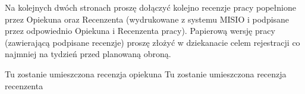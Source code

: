 \newpage

\noindent
Na kolejnych dwóch stronach proszę dołączyć 
kolejno recenzje pracy popełnione przez Opiekuna oraz Recenzenta 
(wydrukowane z systemu MISIO i podpisane 
przez odpowiednio Opiekuna i Recenzenta pracy). 
Papierową wersję pracy (zawierającą 
podpisane recenzje) proszę złożyć
 w dziekanacie celem rejestracji co najmniej 
na tydzień przed planowaną obroną.

\newpage
Tu zostanie umieszczona recenzja opiekuna
\newpage
Tu zostanie umieszczona recenzja recenzenta
\newpage

\linespread{1.3}
\selectfont

